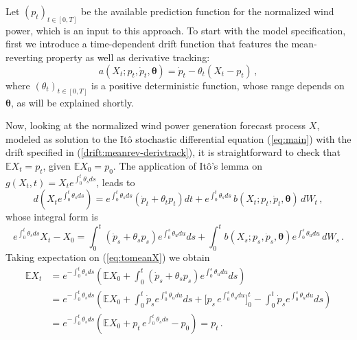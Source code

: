 \documentclass[11pt]{article}
\theoremstyle{definition}
\begin{document}
Let $(p_t)_{t \in [0,T]}$ be the available prediction function for the normalized wind power, which is an input to this approach. To start with the model specification, first we introduce a time-dependent drift function that features the mean-reverting property as well as derivative tracking:
\begin{equation}
a(X_t; p_t, \dot{p}_t, \bm{\theta}) = \dot{p}_t  - \theta_t (X_t - p_t)\,,  \label{drift:meanrev-derivtrack}
\end{equation} 
where $ (\theta_t)_{t \in [0,T]} $ is a positive deterministic function, whose range depends on $\bm{\theta}$, as will be explained shortly.

Now, looking at the normalized wind power generation forecast process $X$, modeled as solution to the It\^{o} stochastic differential equation (\ref{eq:main}) with the drift specified in (\ref{drift:meanrev-derivtrack}), it is straightforward to check that $\mathbb{E} X_t = p_t$, given $  \mathbb{E} X_0 = p_0$. The application of  It\^{o}'s lemma on $g(X_t, t) = X_t e^{\int_{0}^{t} \theta_s ds}$, leads to 
\begin{equation*}
d \left( X_t e^{\int_{0}^{t} \theta_s ds} \right) = e^{\int_{0}^{t} \theta_s ds} (\dot{p}_t + \theta_t p_t ) dt  + e^{\int_{0}^{t} \theta_s ds}\, b (X_t; p_t, \dot{p}_t, \bm{\theta} ) \,dW_t\,,
\end{equation*}
whose integral form is
\begin{equation}
e^{\int_{0}^{t} \theta_s ds}  X_t - X_0 = \int_{0}^{t}  (\dot{p}_s + \theta_s p_s ) e^{\int_{0}^{s} \theta_u du} ds + \int_{0}^{t}  b (X_s; p_s, \dot{p}_s, \bm{\theta} )  e^{\int_{0}^{s} \theta_u du}\, d W_s\,.   \label{eq:tomeanX}
\end{equation} 
Taking expectation on (\ref{eq:tomeanX}) we obtain
\begin{align}
\mathbb{E} X_t & = e^{ - \int_{0}^{t} \theta_s ds} \left(  \mathbb{E} X_0 +   \int_{0}^{t}  (\dot{p}_s + \theta_s p_s ) e^{\int_{0}^{s} \theta_u du} ds   \right) \nonumber \\ 
& =  e^{ - \int_{0}^{t} \theta_s ds} \left(  \mathbb{E} X_0 +   \int_{0}^{t}  \dot{p}_s e^{\int_{0}^{s} \theta_u du} ds +  \big[ p_s \, e^{\int_{0}^{s} \theta_u du} \big]^{t}_0  - \int_{0}^{t}  \dot{p}_s e^{\int_{0}^{s} \theta_u du} ds  \right) \nonumber \\
& =  e^{ - \int_{0}^{t} \theta_s ds} \left(  \mathbb{E} X_0 + p_t \, e^{ \int_{0}^{t} \theta_s ds} - p_0 \right) = p_t \,. \label{eq:meanX}
\end{align}
\end{document}

